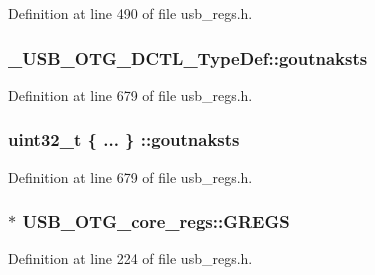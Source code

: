Definition at line 490 of file usb\-\_\-regs.\-h.

\hypertarget{group___u_s_b___o_t_g___d_r_i_v_e_r_ga3b7b7552607f4d947024e7334f9212c1}{
\subsubsection[{goutnaksts}]{ \-\_\-\-U\-S\-B\-\_\-\-O\-T\-G\-\_\-\-D\-C\-T\-L\-\_\-\-Type\-Def\-::goutnaksts}}\label{group___u_s_b___o_t_g___d_r_i_v_e_r_ga3b7b7552607f4d947024e7334f9212c1}


Definition at line 679 of file usb\-\_\-regs.\-h.

\hypertarget{group___u_s_b___o_t_g___d_r_i_v_e_r_gac0ad361f23cfb57ae5c168eb54383fec}{
\subsubsection[{goutnaksts}]{\setlength{\rightskip}{0pt plus 5cm}uint32\-\_\-t \{ ... \} \-::goutnaksts}}\label{group___u_s_b___o_t_g___d_r_i_v_e_r_gac0ad361f23cfb57ae5c168eb54383fec}


Definition at line 679 of file usb\-\_\-regs.\-h.

\hypertarget{group___u_s_b___o_t_g___d_r_i_v_e_r_gacc851a3b405cd504963dc080bea312b6}{
\subsubsection[{G\-R\-E\-G\-S}]{$\ast$ U\-S\-B\-\_\-\-O\-T\-G\-\_\-core\-\_\-regs\-::\-G\-R\-E\-G\-S}}\label{group___u_s_b___o_t_g___d_r_i_v_e_r_gacc851a3b405cd504963dc080bea312b6}


Definition at line 224 of file usb\-\_\-regs.\-h.

